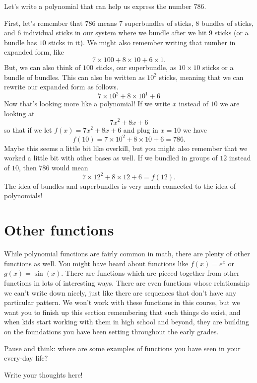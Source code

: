 \documentclass{ximera}
\begin{document}
\begin{example}
Let's write a polynomial that can help us express the number $786$.

First, let's remember that $786$ means $7$ superbundles of sticks, $8$ bundles of sticks, and $6$ individual sticks in our system where we bundle after we hit $9$ sticks (or a bundle has $10$ sticks in it). We might also remember writing that number in expanded form, like
\[
7 \times 100 + 8 \times 10 + 6 \times 1.
\]
But, we can also think of $100$ sticks, our superbundle, as $10 \times 10$ sticks or a bundle of bundles. This can also be written as $10^2$ sticks, meaning that we can rewrite our expanded form as follows.
\[
7 \times 10^2 + 8 \times 10^1 + 6
\]
Now that's looking more like a polynomial! If we write $x$ instead of $10$ we are looking at 
\[
7x^2 + 8 x + 6
\]
so that if we let $f(x) = 7x^2 + 8x + 6$ and plug in $x=10$ we have
\[
f(10) = 7 \times 10^2 + 8 \times 10 + 6 = 786.
\]
Maybe this seems a little bit like overkill, but you might also remember that we worked a little bit with other bases as well. If we bundled in groups of $12$ instead of $10$, then $786$ would mean
\[
7 \times 12^2 + 8 \times 12 + 6 = f(12).
\]
The idea of bundles and superbundles is very much connected to the idea of polynomials!
\end{example}



\section{Other functions}
While polynomial functions are fairly common in math, there are plenty of other functions as well. You might have heard about functions like $f(x) = e^x$ or $g(x) = \sin(x)$. There are functions which are pieced together from other functions in lots of interesting ways. There are even functions whose relationship we can't write down nicely, just like there are sequences that don't have any particular pattern. We won't work with these functions in this course, but we want you to finish up this section remembering that such things do exist, and when kids start working with them in high school and beyond, they are building on the foundations you have been setting throughout the early grades.

\begin{question}
Pause and think: where are some examples of functions you have seen in your every-day life?
\begin{freeResponse}
Write your thoughts here!
\end{freeResponse}
\end{question}
\end{document}
